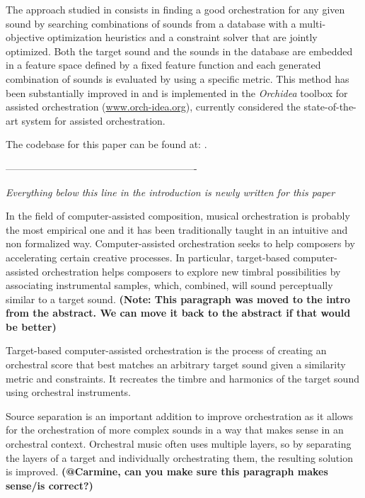 \documentclass{article}
\begin{document}
	The approach studied in \cite{Carpentier2010} consists in finding a good orchestration for any given sound by searching combinations of sounds from a database with a multi-objective optimization heuristics and a constraint solver that are jointly optimized. Both the target sound and the sounds in the database are embedded in a feature space defined by a fixed feature function and each generated combination of sounds is evaluated by using a specific metric. This method has been substantially improved in \cite{Cella18, Cella2020} and is implemented in the \emph{Orchidea} toolbox for assisted orchestration (\url{www.orch-idea.org}), currently considered the state-of-the-art system for assisted orchestration.

	 The codebase for this paper can be found at: \url{}.
	 
	 ----------------------------------------------------------
	 
	 \textit{Everything below this line in the introduction is newly written for this paper}
	 
	 In the field of computer-assisted composition, musical orchestration is probably the most empirical one and it has been traditionally taught in an intuitive and non formalized way. Computer-assisted orchestration seeks to help composers by accelerating certain creative processes. In particular, target-based computer-assisted orchestration helps composers to explore new timbral possibilities by associating instrumental samples, which, combined, will sound perceptually similar to a target sound. \textbf{(Note: This paragraph was moved to the intro from the abstract. We can move it back to the abstract if that would be better)}
	 
	 Target-based computer-assisted orchestration is the process of creating an orchestral score that best matches an arbitrary target sound given a similarity metric and constraints. It recreates the timbre and harmonics of the target sound using orchestral instruments. 
		
		Source separation is an important addition to improve orchestration as it allows for the orchestration of more complex sounds in a way that makes sense in an orchestral context. Orchestral music often uses multiple layers, so by separating the layers of a target and individually orchestrating them, the resulting solution is improved. \textbf{(@Carmine, can you make sure this paragraph makes sense/is correct?)}
		
\end{document}
